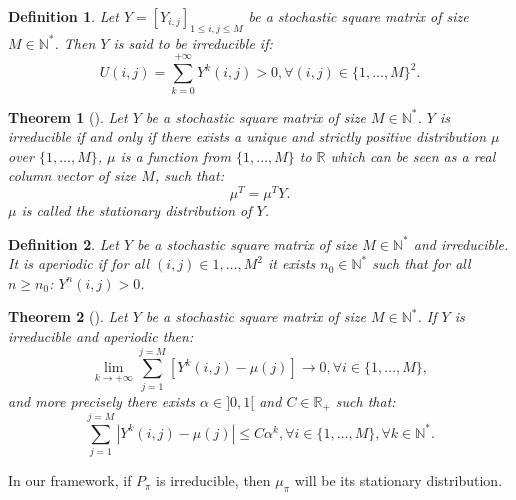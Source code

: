 \documentclass{article} %
\newtheorem{definition}{Definition}
\newtheorem{theorem}{Theorem}
\newcommand{\0}{\mathbf{0}}
\newcommand{\1}{\mathbf{1}}
\begin{document}
\begin{definition}
Let $Y=[Y_{i,j}]_{1\leq i,j \leq M}$ be a  stochastic square matrix of size $M\in\mathbb{N}^*$. Then $Y$ is said to be irreducible if:
\begin{equation}
U(i,j)=\sum_{k=0}^{+\infty}Y^k(i,j)>0 ,\forall (i,j)\in \{1,\dots,M\}^2.
\end{equation}
\end{definition}
\begin{theorem}[\cite{baldi2000martingales}]
Let $Y$  be a stochastic square matrix of size $M\in\mathbb{N}^*$. $Y$ is irreducible if and only if there exists a unique and strictly positive distribution $\mu$ over $\{1,\dots,M\}$, $\mu$ is a function from $\{1,\dots,M\}$ to $\mathbb{R}$ which can be seen as a real column vector of size $M$, such that:
\begin{equation}
\label{equation: stationarity}
\mu^T=\mu^TY.
\end{equation}
$\mu$ is called the stationary distribution of $Y$.
\end{theorem}
\begin{definition}
Let $Y$ be a stochastic square matrix of size $M\in\mathbb{N}^*$ and irreducible. It is aperiodic if for all $(i,j)\in {1,\dots,M}^2$ it exists $n_0\in \mathbb{N}^*$ such that for all $n\geq n_0$: $Y^n(i,j)>0$.
\end{definition}
\begin{theorem}[\cite{baldi2000martingales}]
\label{theoreme : mixing exponential}
Let $Y$ be a stochastic square matrix of size $M\in\mathbb{N}^*$. If $Y$ is irreducible and aperiodic then:
\begin{equation}
\lim_{k\rightarrow +\infty}\sum_{j=1}^{j=M}[Y^k(i,j)-\mu(j)]\rightarrow 0,\forall i\in\{1,\dots,M\},
\end{equation}
and more precisely there exists $\alpha\in]0,1[$ and $C\in\mathbb{R}_+$ such that:
\begin{equation}
\sum_{j=1}^{j=M}|Y^k(i,j)-\mu(j)|\leq C\alpha^k,\forall i\in\{1,\dots,M\},\forall k\in\mathbb{N}^*.
\end{equation}
\end{theorem}
In our framework, if $P_\pi$ is irreducible, then $\mu_\pi$ will be its stationary distribution.
\end{document}
